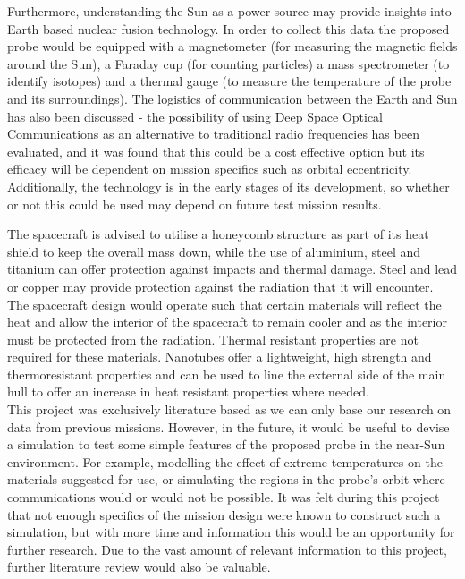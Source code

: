 \documentclass[12pt]{article}
\begin{document}
Furthermore, understanding the Sun as a power source may provide insights into Earth based nuclear fusion technology. In order to collect this data the proposed probe would be equipped with a magnetometer (for measuring the magnetic fields around the Sun), a Faraday cup (for counting particles) a mass spectrometer (to identify isotopes) and a thermal gauge (to measure the temperature of the probe and its surroundings). The logistics of communication between the Earth and Sun has also been discussed - the possibility of using Deep Space Optical Communications as an alternative to traditional radio frequencies has been evaluated, and it was found that this could be a cost effective option but its efficacy will be dependent on mission specifics such as orbital eccentricity. Additionally, the technology is in the early stages of its development, so whether or not this could be used may depend on future test mission results.

\vspace{\baselineskip}

The spacecraft is advised to utilise a honeycomb structure as part of its heat shield to keep the overall mass down, while the use of aluminium, steel and titanium can offer protection against impacts and thermal damage. Steel and lead or copper may provide protection against the radiation that it will encounter. The spacecraft design would operate such that certain materials will reflect the heat and allow the interior of the spacecraft to remain cooler and as the interior must be protected from the radiation. Thermal resistant properties are not required for these materials. Nanotubes offer a lightweight, high strength and thermoresistant properties and can be used to line the external side of the main hull to offer an increase in heat resistant properties where needed. \\

This project was exclusively literature based as we can only base our research on data from previous missions. However, in the future, it would be useful to devise a simulation to test some simple features of the proposed probe in the near-Sun environment. For example, modelling the effect of extreme temperatures on the materials suggested for use, or simulating the regions in the probe's orbit where communications would or would not be possible. It was felt during this project that not enough specifics of the mission design were known to construct such a simulation, but with more time and information this would be an opportunity for further research. Due to the vast amount of relevant information to this project, further literature review would also be valuable.  
\end{document}
